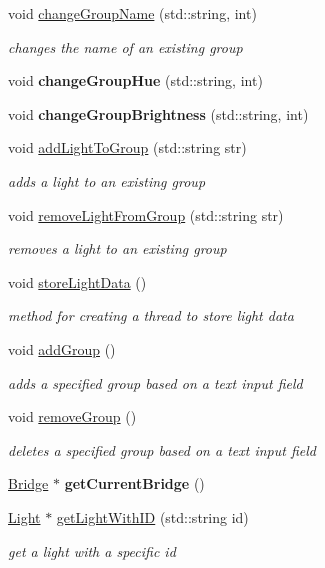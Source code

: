 \begin{DoxyCompactItemize}
void \hyperlink{class_home_page_a515f5cac6f72edd5303f2e1131216640}{change\+Group\+Name} (std\+::string, int)
\begin{DoxyCompactList}\small\item\em changes the name of an existing group \end{DoxyCompactList}\item 
\mbox{\label{class_home_page_a46232e6266b10bf35752fc4b2665e668}} 
void {\bfseries change\+Group\+Hue} (std\+::string, int)
\item 
\mbox{\label{class_home_page_a2f340e5557757b8040b5ba26b1141442}} 
void {\bfseries change\+Group\+Brightness} (std\+::string, int)
\item 
void \hyperlink{class_home_page_ab85e660ef34d71e7d17872937ee01d7f}{add\+Light\+To\+Group} (std\+::string str)
\begin{DoxyCompactList}\small\item\em adds a light to an existing group \end{DoxyCompactList}\item 
void \hyperlink{class_home_page_ace0313d818ae7561f7707c6fa74f630b}{remove\+Light\+From\+Group} (std\+::string str)
\begin{DoxyCompactList}\small\item\em removes a light to an existing group \end{DoxyCompactList}\item 
void \hyperlink{class_home_page_a0b2d780662f8946abb173e1f3fe136d7}{store\+Light\+Data} ()
\begin{DoxyCompactList}\small\item\em method for creating a thread to store light data \end{DoxyCompactList}\item 
void \hyperlink{class_home_page_ad81aea92b5f0273686d3b25d22ed6d77}{add\+Group} ()
\begin{DoxyCompactList}\small\item\em adds a specified group based on a text input field \end{DoxyCompactList}\item 
void \hyperlink{class_home_page_a019ab5ef1587a197837badfc32725af8}{remove\+Group} ()
\begin{DoxyCompactList}\small\item\em deletes a specified group based on a text input field \end{DoxyCompactList}\item 
\mbox{\label{class_home_page_a85bfcacf19ee6acb3186550e5498d119}} 
\hyperlink{class_bridge}{Bridge} $\ast$ {\bfseries get\+Current\+Bridge} ()
\item 
\hyperlink{class_light}{Light} $\ast$ \hyperlink{class_home_page_ac9c95668c61d02a9ed50675402296d66}{get\+Light\+With\+ID} (std\+::string id)
\begin{DoxyCompactList}\small\item\em get a light with a specific id \end{DoxyCompactList}\end{DoxyCompactItemize}
